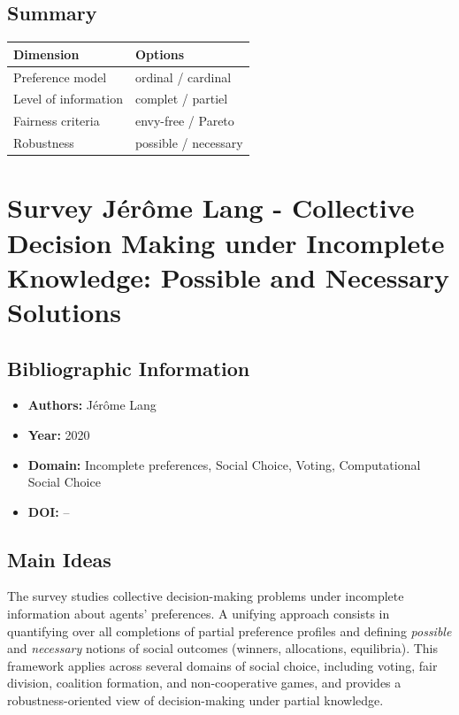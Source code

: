 \documentclass[12pt,a4paper]{article}
\begin{document}
\subsection*{Summary}

\begin{center}
\begin{tabular}{ll}
\toprule
\textbf{Dimension} & \textbf{Options} \\
\midrule
Preference model & ordinal / cardinal \\
Level of information & complet / partiel \\
Fairness criteria & envy-free / Pareto \\
Robustness & possible / necessary \\
\bottomrule
\end{tabular}
\end{center}


\newpage


\section{Survey Jérôme Lang - Collective Decision Making under Incomplete Knowledge: Possible and Necessary Solutions}
\label{sec:article3}

\subsection*{Bibliographic Information}
\begin{itemize}
    \item \textbf{Authors:} Jérôme Lang
    \item \textbf{Year:} 2020
    \item \textbf{Domain:} Incomplete preferences, Social Choice, Voting, Computational Social Choice
    \item \textbf{DOI:} --
\end{itemize}

\subsection*{Main Ideas}
\begin{tcolorbox}[colback=blue!5!white, colframe=blue!50!black]
The survey studies collective decision-making problems under incomplete information about agents' preferences.
A unifying approach consists in quantifying over all completions of partial preference profiles and defining
\emph{possible} and \emph{necessary} notions of social outcomes (winners, allocations, equilibria).
This framework applies across several domains of social choice, including voting, fair division, coalition formation,
and non-cooperative games, and provides a robustness-oriented view of decision-making under partial knowledge.
\end{tcolorbox}
\end{document}
